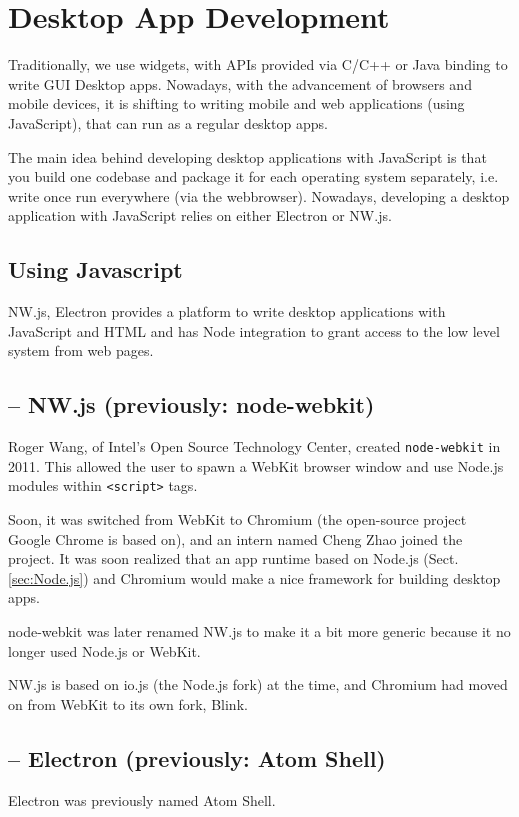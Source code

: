 \chapter{Desktop App Development}

Traditionally, we use widgets, with APIs provided via C/C++ or Java binding to
write GUI Desktop apps. Nowadays, with the advancement of browsers and mobile
devices, it is shifting to writing mobile and web applications (using
JavaScript), that can run as a regular desktop apps. 

The main idea behind developing desktop applications with JavaScript is that you
build one codebase and package it for each operating system separately, i.e.
write once run everywhere (via the webbrowser). Nowadays, developing a desktop
application with JavaScript relies on either Electron or NW.js.

\section{Using Javascript}

NW.js, Electron provides a platform to write desktop applications with
JavaScript and HTML and has Node integration to grant access to the low level
system from web pages. 

\section{-- NW.js (previously: node-webkit)}

Roger Wang, of Intel's Open Source Technology Center, created \verb!node-webkit!
in 2011. This allowed the user to spawn a WebKit browser window and use Node.js
modules within \verb!<script>! tags.

Soon, it was switched from WebKit to Chromium (the open-source project Google
Chrome is based on), and an intern named Cheng Zhao joined the project. It was
soon realized that an app runtime based on Node.js (Sect.\ref{sec:Node.js}) and
Chromium would make a nice framework for building desktop apps.

\begin{mdframed}
node-webkit was later renamed NW.js to make it a bit more generic because it no
longer used Node.js or WebKit.

NW.js is based on io.js (the Node.js fork) at the time, and Chromium had moved
on from WebKit to its own fork, Blink.

\end{mdframed}

\section{-- Electron (previously: Atom Shell)}

Electron was previously named Atom Shell.

